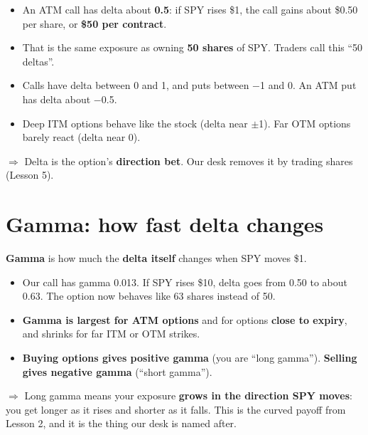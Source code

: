 \documentclass{article}
\begin{document}
\begin{itemize}

\item An ATM call has delta about \textbf{0.5}: if SPY rises \$1, the call gains about \$0.50 per share, or \textbf{\$50 per contract}.

\item That is the same exposure as owning \textbf{50 shares} of SPY. Traders call this ``50 deltas''.

\item Calls have delta between 0 and 1, and puts between \ensuremath{-}1 and 0. An ATM put has delta about \ensuremath{-}0.5.

\item Deep ITM options behave like the stock (delta near \ensuremath{\pm}1). Far OTM options barely react (delta near 0).

\end{itemize}

\textbf{$\Rightarrow$} Delta is the option's \textbf{direction bet}. Our desk removes it by trading shares (Lesson 5).

\section{Gamma: how fast delta changes}

\textbf{Gamma} is how much the \textbf{delta itself} changes when SPY moves \$1.

\begin{itemize}

\item Our call has gamma 0.013. If SPY rises \$10, delta goes from 0.50 to about 0.63. The option now behaves like 63 shares instead of 50.

\item \textbf{Gamma is largest for ATM options} and for options \textbf{close to expiry}, and shrinks for far ITM or OTM strikes.

\item \textbf{Buying options gives positive gamma} (you are ``long gamma''). \textbf{Selling gives negative gamma} (``short gamma'').

\end{itemize}

\textbf{$\Rightarrow$} Long gamma means your exposure \textbf{grows in the direction SPY moves}: you get longer as it rises and shorter as it falls. This is the curved payoff from Lesson 2, and it is the thing our desk is named after.
\end{document}
